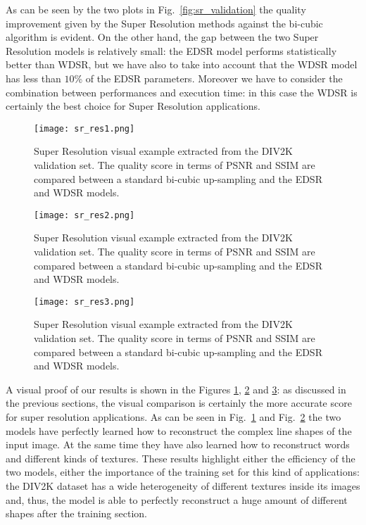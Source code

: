 \documentclass{standalone}
\begin{document}
As can be seen by the two plots in Fig.~\ref{fig:sr_validation} the quality improvement given by the Super Resolution methods against the bi-cubic algorithm is evident.
On the other hand, the gap between the two Super Resolution models is relatively small: the EDSR model performs statistically better than WDSR, but we have also to take into account that the WDSR model has less than $10$\% of the EDSR parameters.
Moreover we have to consider the combination between performances and execution time: in this case the WDSR is certainly the best choice for Super Resolution applications.

\begin{figure}[htbp]
\centering
\texttt{[image: sr\_res1.png]}
\caption{Super Resolution visual example extracted from the DIV2K validation set.
The quality score in terms of PSNR and SSIM are compared between a standard bi-cubic up-sampling and the EDSR and WDSR models.
}
\label{fig:sr_ex1}
\end{figure}

\begin{figure}[htbp]
\centering
\texttt{[image: sr\_res2.png]}
\caption{Super Resolution visual example extracted from the DIV2K validation set.
The quality score in terms of PSNR and SSIM are compared between a standard bi-cubic up-sampling and the EDSR and WDSR models.
}
\label{fig:sr_ex2}
\end{figure}

\begin{figure}[htbp]
\centering
\texttt{[image: sr\_res3.png]}
\caption{Super Resolution visual example extracted from the DIV2K validation set.
The quality score in terms of PSNR and SSIM are compared between a standard bi-cubic up-sampling and the EDSR and WDSR models.
}
\label{fig:sr_ex3}
\end{figure}

A visual proof of our results is shown in the Figures \ref{fig:sr_ex1}, \ref{fig:sr_ex2} and \ref{fig:sr_ex3}: as discussed in the previous sections, the visual comparison is certainly the more accurate score for super resolution applications.
As can be seen in Fig.~\ref{fig:sr_ex1} and Fig.~\ref{fig:sr_ex2} the two models have perfectly learned how to reconstruct the complex line shapes of the input image.
At the same time they have also learned how to reconstruct words and different kinds of textures.
These results highlight either the efficiency of the two models, either the importance of the training set for this kind of applications: the DIV2K dataset has a wide heterogeneity of different textures inside its images and, thus, the model is able to perfectly reconstruct a huge amount of different shapes after the training section.
\end{document}
